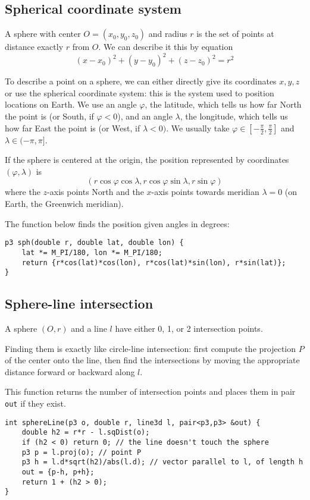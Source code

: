 \subsection{Spherical coordinate system}
A sphere with center $O=(x_0,y_0,z_0)$ and radius $r$ is the set of points at distance exactly $r$ from $O$.
We can describe it this by equation
\[(x-x_0)^2+(y-y_0)^2+(z-z_0)^2 = r^2\]


To describe a point on a sphere, we can either directly give its coordinates $x,y,z$ or use the spherical coordinate system: this is the system used to position locations on Earth. We use an angle $\varphi$, the latitude, which tells us how far North the point is (or South, if $\varphi<0$), and an angle $\lambda$, the longitude, which tells us how far East the point is (or West, if $\lambda<0)$. We usually take $\varphi \in [-\frac{\pi}{2},\frac{\pi}{2}]$ and $\lambda \in (-\pi,\pi]$.


If the sphere is centered at the origin, the position represented by coordinates $(\varphi,\lambda)$ is
\[(r\cos\varphi\cos\lambda, r\cos\varphi\sin\lambda, r\sin\varphi)\]
where the $z$-axis points North and the $x$-axis points towards meridian $\lambda=0$ (on Earth, the Greenwich meridian).

The function below finds the position given angles in degrees:
\begin{lstlisting}
p3 sph(double r, double lat, double lon) {
    lat *= M_PI/180, lon *= M_PI/180;
    return {r*cos(lat)*cos(lon), r*cos(lat)*sin(lon), r*sin(lat)};
}
\end{lstlisting}

\subsection{Sphere-line intersection}
A sphere $(O,r)$ and a line $l$ have either 0, 1, or 2 intersection points.


Finding them is exactly like circle-line intersection: first compute the projection $P$ of the center onto the line, then find the intersections by moving the appropriate distance forward or backward along $l$.


This function returns the number of intersection points and places them in pair \lstinline|out| if they exist.
\begin{lstlisting}
int sphereLine(p3 o, double r, line3d l, pair<p3,p3> &out) {
    double h2 = r*r - l.sqDist(o);
    if (h2 < 0) return 0; // the line doesn't touch the sphere
    p3 p = l.proj(o); // point P
    p3 h = l.d*sqrt(h2)/abs(l.d); // vector parallel to l, of length h
    out = {p-h, p+h};
    return 1 + (h2 > 0);
}
\end{lstlisting}
